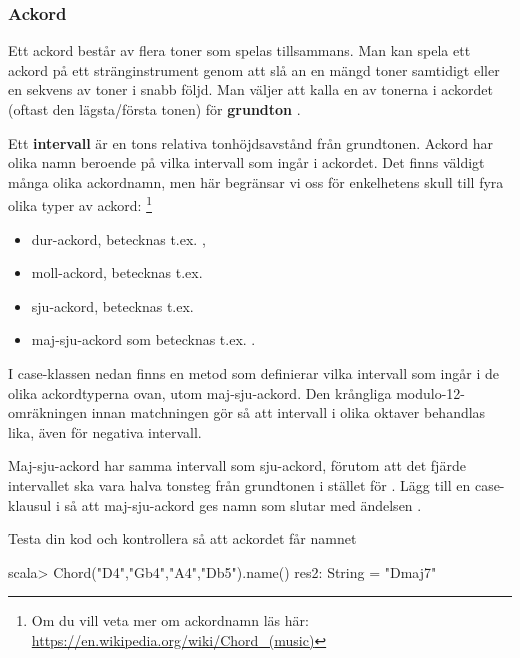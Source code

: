 \subsubsection{Ackord}

Ett ackord består av flera toner som spelas tillsammans. Man kan spela ett ackord på ett stränginstrument genom att slå an en mängd toner samtidigt eller en sekvens av toner i snabb följd. Man väljer att kalla en av tonerna i ackordet (oftast den lägsta/första tonen) för \textbf{grundton} .

Ett \textbf{intervall} är en tons relativa tonhöjdsavstånd från grundtonen. Ackord har olika namn beroende på vilka intervall som ingår i ackordet. Det finns väldigt många olika ackordnamn, men här begränsar vi oss för enkelhetens skull till fyra olika typer av ackord: \footnote{Om du vill veta mer om ackordnamn läs här: \url{https://en.wikipedia.org/wiki/Chord_(music)}}
\begin{itemize}
  \item dur-ackord, betecknas t.ex. ,
  \item moll-ackord, betecknas t.ex. 
  \item sju-ackord, betecknas t.ex. 
  \item maj-sju-ackord som betecknas t.ex. .
\end{itemize}

I case-klassen  nedan finns en metod  som definierar vilka intervall som ingår i de olika ackordtyperna ovan, utom maj-sju-ackord. Den krångliga modulo-12-omräkningen innan matchningen gör så att intervall i olika oktaver behandlas lika, även för negativa intervall.


\Task

\Subtask Maj-sju-ackord har samma intervall som sju-ackord, förutom att det fjärde intervallet ska vara  halva tonsteg från grundtonen i stället för . Lägg till en case-klausul i  så att maj-sju-ackord ges namn som slutar med ändelsen .

\Subtask Testa din kod och kontrollera så att ackordet  får namnet 

\begin{REPL}
scala> Chord("D4","Gb4","A4","Db5").name()
res2: String = "Dmaj7"
\end{REPL}

